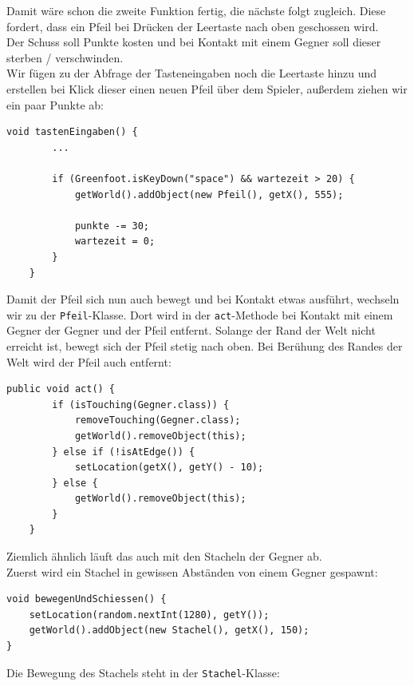 \documentclass{scrartcl}   %
\begin{document}
Damit wäre schon die zweite Funktion fertig, die nächste folgt zugleich. Diese fordert, dass ein Pfeil bei Drücken der Leertaste nach oben geschossen wird.\\
Der Schuss soll Punkte kosten und bei Kontakt mit einem Gegner soll dieser sterben / verschwinden.\\
Wir fügen zu der Abfrage der Tasteneingaben noch die Leertaste hinzu und erstellen bei Klick dieser einen neuen Pfeil über dem Spieler, außerdem ziehen wir ein paar Punkte ab:\\
\begin{lstlisting}
void tastenEingaben() {
        ...

        if (Greenfoot.isKeyDown("space") && wartezeit > 20) {
            getWorld().addObject(new Pfeil(), getX(), 555);

            punkte -= 30;
            wartezeit = 0;
        }
    }
\end{lstlisting}

Damit der Pfeil sich nun auch bewegt und bei Kontakt etwas ausführt, wechseln wir zu der \texttt{Pfeil}-Klasse. Dort wird in der \texttt{act}-Methode bei Kontakt mit einem Gegner der Gegner und der Pfeil entfernt. Solange der Rand der Welt nicht erreicht ist, bewegt sich der Pfeil stetig nach oben. Bei Berühung des Randes der Welt wird der Pfeil auch entfernt:

\newpage

\begin{lstlisting}
public void act() {
        if (isTouching(Gegner.class)) {
            removeTouching(Gegner.class);
            getWorld().removeObject(this);
        } else if (!isAtEdge()) {
            setLocation(getX(), getY() - 10);
        } else {
            getWorld().removeObject(this);
        }
    }  
\end{lstlisting}


Ziemlich ähnlich läuft das auch mit den Stacheln der Gegner ab.\\
Zuerst wird ein Stachel in gewissen Abständen von einem Gegner gespawnt:\\

\begin{lstlisting}
void bewegenUndSchiessen() {
    setLocation(random.nextInt(1280), getY());
    getWorld().addObject(new Stachel(), getX(), 150);
}
\end{lstlisting}

Die Bewegung des Stachels steht in der \texttt{Stachel}-Klasse:\\
\end{document}
